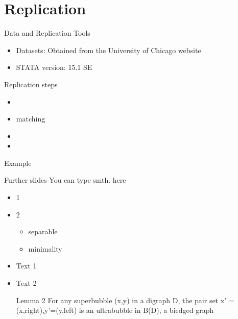 \documentclass{beamer}
\begin{document}
\section{Replication}
\begin{frame}{Data and Replication Tools}
\begin{itemize}
    \item Datasets: Obtained from the University of Chicago website \item STATA version: 15.1 SE
\end{itemize}
\end{frame}
\begin{frame}{Replication steps}
 \begin{itemize}
    \item 
    \item matching
    \item 
    \item 
\end{itemize}
\end{frame}
\begin{frame}{ Example}

\end{frame}
\begin{frame}{Further slides}
You can type smth. here
\begin{itemize}
    \item 1
    \item 2
    \begin{itemize}
        \item separable
        \item minimality
    \end{itemize}
    \item Text 1
    \item Text 2
    \begin{block}{Lemma 2}
    For any superbubble (x,y) in a digraph D, the pair set {x' = (x,right),y'=(y,left)} is an ultrabubble in B(D), a biedged graph
    \end{block}
\end{itemize}
\end{frame}
\end{document}
